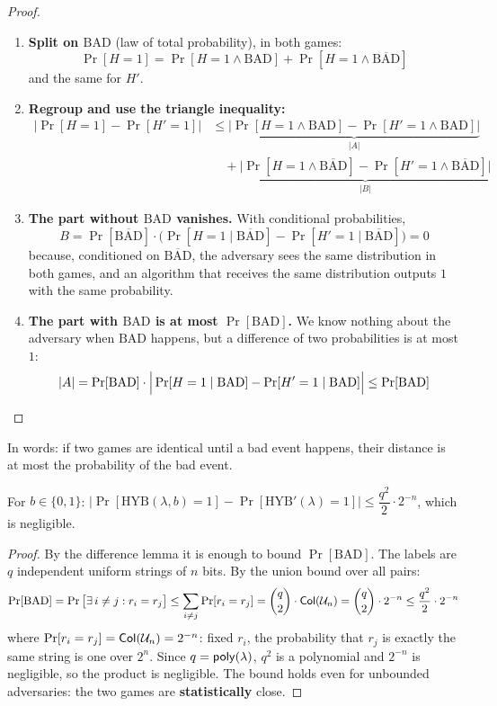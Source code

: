 \begin{proof}
  \leavevmode
  \begin{enumerate}
    \item \textbf{Split on $\mathrm{BAD}$} (law of total probability), in both games:
    \[
      \Pr[H = 1] = \Pr[H = 1 \wedge \mathrm{BAD}] + \Pr[H = 1 \wedge \overline{\mathrm{BAD}}]
    \]
    and the same for $H'$.
    \item \textbf{Regroup and use the triangle inequality:}
    \[
      \begin{aligned}
        \big|\Pr[H = 1] - \Pr[H' = 1]\big| &\leq
        \underbrace{\big|\Pr[H = 1 \wedge \mathrm{BAD}] - \Pr[H' = 1 \wedge \mathrm{BAD}]\big|}_{|A|} \\
        &\quad + \underbrace{\big|\Pr[H = 1 \wedge \overline{\mathrm{BAD}}] - \Pr[H' = 1 \wedge \overline{\mathrm{BAD}}]\big|}_{|B|}
      \end{aligned}
    \]
    \item \textbf{The part without $\mathrm{BAD}$ vanishes.} With conditional probabilities,
    \[
      B = \Pr[\overline{\mathrm{BAD}}] \cdot \Big(\Pr[H = 1 \mid \overline{\mathrm{BAD}}] - \Pr[H' = 1 \mid \overline{\mathrm{BAD}}]\Big) = 0
    \]
    because, conditioned on $\overline{\mathrm{BAD}}$, the adversary sees the same distribution in both games, and an algorithm that receives the same distribution outputs $1$ with the same probability.
    \item \textbf{The part with $\mathrm{BAD}$ is at most $\Pr[\mathrm{BAD}]$.} We know nothing about the adversary when $\mathrm{BAD}$ happens, but a difference of two probabilities is at most $1$:
    \[
      |A| = \Pr[\mathrm{BAD}] \cdot \Big|\Pr[H = 1 \mid \mathrm{BAD}] - \Pr[H' = 1 \mid \mathrm{BAD}]\Big| \leq \Pr[\mathrm{BAD}] \qedhere
    \]
  \end{enumerate}
\end{proof}

In words: if two games are identical until a bad event happens, their distance is at most the probability of the bad event.

\begin{framedlem}[label={lem:hyb-hybprime}]{}
  For $b \in \{0,1\}$: $\big|\Pr[\mathrm{HYB}(\lambda, b) = 1] - \Pr[\mathrm{HYB}'(\lambda) = 1]\big| \leq \dfrac{q^2}{2} \cdot 2^{-n}$, which is negligible.
\end{framedlem}

\begin{proof}
  By the difference lemma it is enough to bound $\Pr[\mathrm{BAD}]$. The labels are $q$ independent uniform strings of $n$ bits. By the union bound over all pairs:
  \[
    \Pr[\mathrm{BAD}] = \Pr\big[\exists\, i \neq j : r_i = r_j\big]
    \leq \sum_{i \neq j} \Pr[r_i = r_j]
    = \binom{q}{2} \cdot \mathsf{Col}(\mathcal{U}_{n})
    = \binom{q}{2} \cdot 2^{-n}
    \leq \frac{q^2}{2} \cdot 2^{-n}
  \]
  where $\Pr[r_i = r_j] = \mathsf{Col}(\mathcal{U}_{n}) = 2^{-n}$: fixed $r_i$, the probability that $r_j$ is exactly the same string is one over $2^n$. Since $q = \mathsf{poly}(\lambda)$, $q^2$ is a polynomial and $2^{-n}$ is negligible, so the product is negligible. The bound holds even for unbounded adversaries: the two games are \textbf{statistically} close.
\end{proof}

